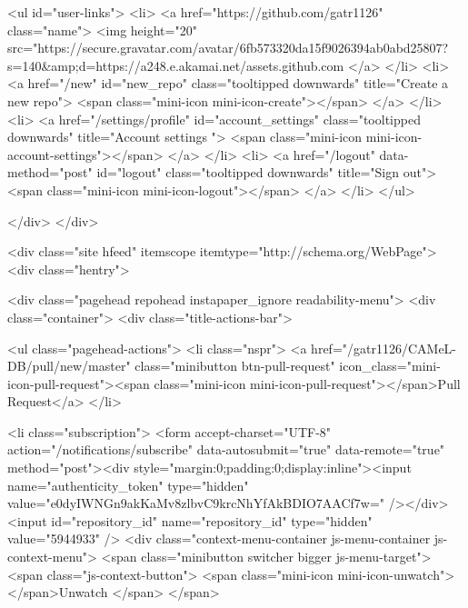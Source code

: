             

  
    <ul id="user-links">
      <li>
        <a href="https://github.com/gatr1126" class="name">
          <img height="20" src="https://secure.gravatar.com/avatar/6fb573320da15f9026394ab0abd25807?s=140&amp;d=https://a248.e.akamai.net/assets.github.com%
        </a>
      </li>
      <li>
        <a href="/new" id="new_repo" class="tooltipped downwards" title="Create a new repo">
          <span class="mini-icon mini-icon-create"></span>
        </a>
      </li>
      <li>
        <a href="/settings/profile" id="account_settings"
          class="tooltipped downwards"
          title="Account settings ">
          <span class="mini-icon mini-icon-account-settings"></span>
        </a>
      </li>
      <li>
          <a href="/logout" data-method="post" id="logout" class="tooltipped downwards" title="Sign out">
            <span class="mini-icon mini-icon-logout"></span>
          </a>
      </li>
    </ul>



            
          </div>
        </div>


      

      


            <div class="site hfeed" itemscope itemtype="http://schema.org/WebPage">
      <div class="hentry">
        
        <div class="pagehead repohead instapaper_ignore readability-menu">
          <div class="container">
            <div class="title-actions-bar">
              


                  <ul class="pagehead-actions">
          <li class="nspr">
            <a href="/gatr1126/CAMeL-DB/pull/new/master" class="minibutton btn-pull-request" icon_class="mini-icon-pull-request"><span class="mini-icon mini-icon-pull-request"></span>Pull Request</a>
          </li>

          <li class="subscription">
              <form accept-charset="UTF-8" action="/notifications/subscribe" data-autosubmit="true" data-remote="true" method="post"><div style="margin:0;padding:0;display:inline"><input name="authenticity_token" type="hidden" value="e0dyIWNGn9akKaMv8zlbvC9krcNhYfAkBDIO7AACf7w=" /></div>  <input id="repository_id" name="repository_id" type="hidden" value="5944933" />
  <div class="context-menu-container js-menu-container js-context-menu">
    <span class="minibutton switcher bigger js-menu-target">
      <span class="js-context-button">
          <span class="mini-icon mini-icon-unwatch"></span>Unwatch
      </span>
    </span>


